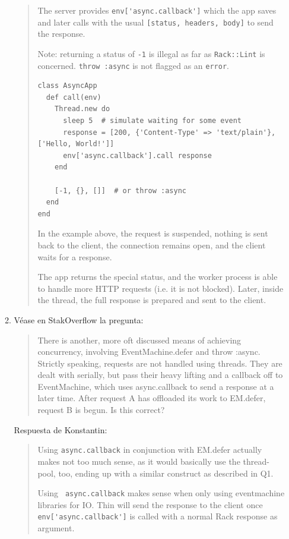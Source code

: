 \begin{enumerate}
\begin{enumerate}
\begin{quote}
The server provides
\verb|env['async.callback']| 
which the app saves and later calls with the
usual \verb|[status, headers, body]| 
to send the response.

Note: returning a status of \verb|-1| is illegal as far as \verb|Rack::Lint| is
concerned. \verb|throw :async| is not flagged as an \verb|error|.
\begin{verbatim}
class AsyncApp
  def call(env)
    Thread.new do
      sleep 5  # simulate waiting for some event
      response = [200, {'Content-Type' => 'text/plain'}, ['Hello, World!']]
      env['async.callback'].call response
    end
    
    [-1, {}, []]  # or throw :async
  end
end
\end{verbatim}

In the example above, the request is suspended, nothing is sent
back to the client, the connection remains open, and the client
waits for a response. 

The app returns the special status, and the
worker process is able to handle more HTTP requests (i.e. it is not
blocked). Later, inside the thread, the full response is prepared
and sent to the client.
\end{quote}

\item  Véase en StakOverflow la pregunta:

\begin{quote}
There is another, more oft discussed means of achieving concurrency,
involving EventMachine.defer and throw :async. Strictly speaking,
requests are not handled using threads. They are dealt with serially,
but pass their heavy lifting and a callback off to EventMachine,
which uses async.callback to send a response at a later time. After
request A has offloaded its work to EM.defer, request B is begun.
Is this correct?
\end{quote}

Respuesta de Konstantin:

\begin{quote}
 Using \verb|async.callback| in conjunction with EM.defer actually makes
 not too much sense, as it would basically use the thread-pool,
 too, ending up with a similar construct as described in Q1. 

Using
\verb| async.callback| makes sense when only using eventmachine libraries
 for IO. Thin will send the response to the client once
\verb| env['async.callback']| is called with a normal Rack response as
 argument.


\end{quote}
\end{enumerate}
\end{enumerate}
